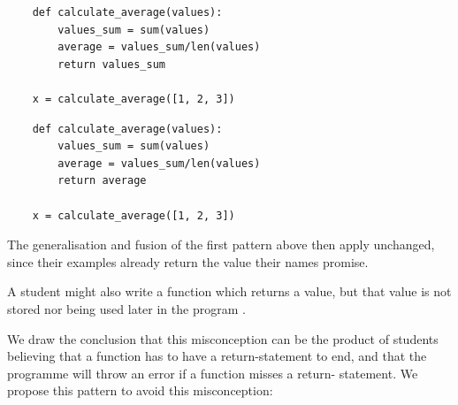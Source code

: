\hfill
\begin{minipage}[t]{0.45\columnwidth}
  \begin{verbatim}
    def calculate_average(values):
        values_sum = sum(values)
        average = values_sum/len(values)
        return values_sum

    x = calculate_average([1, 2, 3])
  \end{verbatim}
\end{minipage}
\hfill
\begin{minipage}[t]{0.45\columnwidth}
  \begin{verbatim}
    def calculate_average(values):
        values_sum = sum(values)
        average = values_sum/len(values)
        return average

    x = calculate_average([1, 2, 3])
  \end{verbatim}
\end{minipage}

The generalisation and fusion of the first pattern above then apply
unchanged, since their examples already return the value their names
promise.

A student might also write a function which returns a value, but that
value is not stored nor being used later in the program 
\autocite{AltadmriBrown2015}.


We draw the conclusion that this misconception can be the product of 
students believing that a function has to have a return-statement to end, 
and that the programme will throw an error if a function misses a return-
statement. We propose this pattern to avoid this misconception:

